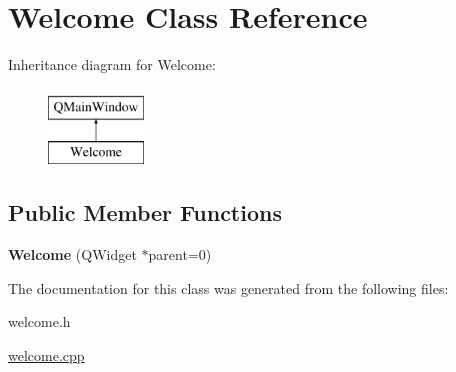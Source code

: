 \hypertarget{classWelcome}{\section{Welcome Class Reference}
\label{classWelcome}
}
Inheritance diagram for Welcome\-:\begin{figure}[H]
\begin{center}
\leavevmode
\includegraphics[height=2.000000cm]{classWelcome}
\end{center}
\end{figure}
\subsection*{Public Member Functions}
\begin{DoxyCompactItemize}
\item 
\hypertarget{classWelcome_acf62624f1107ddc68761d25febbf10ad}{{\bfseries Welcome} (Q\-Widget $\ast$parent=0)}\label{classWelcome_acf62624f1107ddc68761d25febbf10ad}

\end{DoxyCompactItemize}


The documentation for this class was generated from the following files\-:\begin{DoxyCompactItemize}
\item 
welcome.\-h\item 
\hyperlink{welcome_8cpp}{welcome.\-cpp}\end{DoxyCompactItemize}

